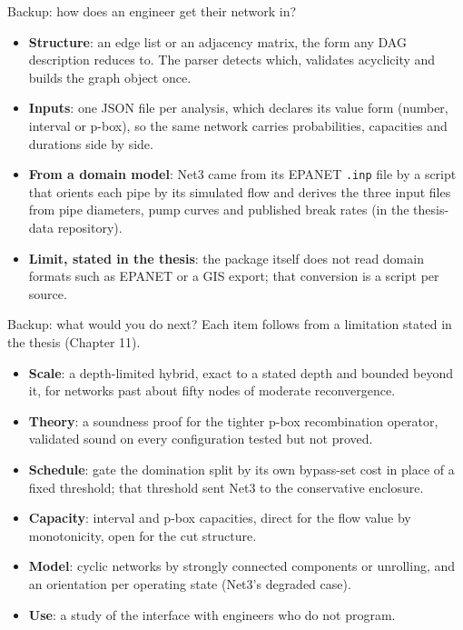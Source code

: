 \documentclass[aspectratio=169,11pt]{beamer}
\begin{document}
\appendix
\begin{frame}{Backup: how does an engineer get their network in?}
\small
\begin{itemize}
  \item \textbf{Structure}: an edge list or an adjacency matrix, the form any DAG description
  reduces to. The parser detects which, validates acyclicity and builds the graph object once.
  \item \textbf{Inputs}: one JSON file per analysis, which declares its value form (number,
  interval or p-box), so the same network carries probabilities, capacities and durations side
  by side.
  \item \textbf{From a domain model}: Net3 came from its EPANET \texttt{.inp} file by a script
  that orients each pipe by its simulated flow and derives the three input files from pipe
  diameters, pump curves and published break rates (in the thesis-data repository).
  \item \textbf{Limit, stated in the thesis}: the package itself does not read domain formats
  such as EPANET or a GIS export; that conversion is a script per source.
\end{itemize}
\end{frame}

\begin{frame}{Backup: what would you do next?}
\small
Each item follows from a limitation stated in the thesis (Chapter 11).
\begin{itemize}
  \item \textbf{Scale}: a depth-limited hybrid, exact to a stated depth and bounded beyond it,
  for networks past about fifty nodes of moderate reconvergence.
  \item \textbf{Theory}: a soundness proof for the tighter p-box recombination operator,
  validated sound on every configuration tested but not proved.
  \item \textbf{Schedule}: gate the domination split by its own bypass-set cost in place of a
  fixed threshold; that threshold sent Net3 to the conservative enclosure.
  \item \textbf{Capacity}: interval and p-box capacities, direct for the flow value by
  monotonicity, open for the cut structure.
  \item \textbf{Model}: cyclic networks by strongly connected components or unrolling, and an
  orientation per operating state (Net3's degraded case).
  \item \textbf{Use}: a study of the interface with engineers who do not program.
\end{itemize}
\end{frame}
\end{document}
